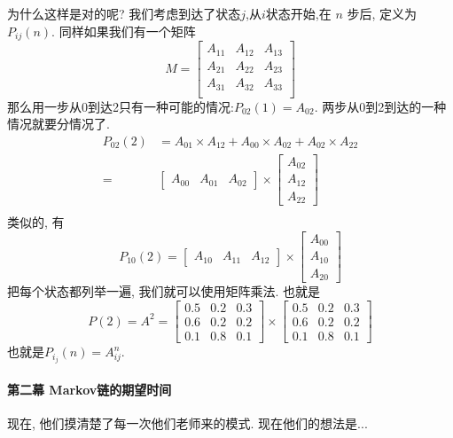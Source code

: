 为什么这样是对的呢? 我们考虑到达了状态$j$,从$i$状态开始,在 $n$ 步后, 定义为$P_{ij}(n)$. 同样如果我们有一个矩阵$$
M=\left[\begin{array}{ccc}
A_{11} & A_{12} & A_{13} \\ 
A_{21} & A_{22} & A_{23} \\ 
A_{31} & A_{32} & A_{33} \\ 
\end{array}\right]
$$
那么用一步从0到达2只有一种可能的情况:$P_{02}(1)=A_{02}$.  两步从0到2到达的一种情况就要分情况了. 
$$
\begin{aligned}
 P_{02}(2)&=A_{01} \times A_{12}+A_{00} \times A_{02}+A_{02} \times A_{22} \\
=& \left[\begin{array}{lll}
A_{00} & A_{01} & A_{02}
\end{array}\right] \times\left[\begin{array}{l}
A_{02} \\
A_{12} \\
A_{22}
\end{array}\right] \\
&
\end{aligned}
$$
类似的, 有$$
P_{10}(2)=\left[\begin{array}{lll}
A_{10} & A_{11} & A_{12}
\end{array}\right] \times\left[\begin{array}{c}
A_{00} \\
A_{10} \\
A_{20}
\end{array}\right]
$$
把每个状态都列举一遍, 我们就可以使用矩阵乘法. 也就是$$
P(2)=A^2=\left[\begin{array}{ccc}
0.5 & 0.2 & 0.3 \\
0.6 & 0.2 & 0.2 \\
0.1 & 0.8 & 0.1
\end{array}\right] \times\left[\begin{array}{ccc}
0.5 & 0.2 & 0.3 \\
0.6 & 0.2 & 0.2 \\
0.1 & 0.8 & 0.1
\end{array}\right]
$$也就是$P_{i_j}(n)=A_{i j}^n$. 

\paragraph{第二幕 Markov链的期望时间} 现在, 他们摸清楚了每一次他们老师来的模式. 
现在他们的想法是...